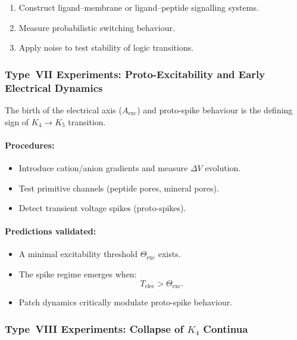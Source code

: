 \begin{enumerate}
    \item Construct ligand–membrane or ligand–peptide signalling systems.
    \item Measure probabilistic switching behaviour.
    \item Apply noise to test stability of logic transitions.
\end{enumerate}



\subsubsection{Type~VII Experiments: Proto-Excitability and Early Electrical Dynamics}

The birth of the electrical axis ($A_{\mathrm{exc}}$) and proto-spike 
behaviour is the defining sign of $K_4 \rightarrow K_5$ transition.

\paragraph{Procedures:}

\begin{itemize}
    \item Introduce cation/anion gradients and measure $\Delta V$ evolution.
    \item Test primitive channels (peptide pores, mineral pores).
    \item Detect transient voltage spikes (proto-spikes).
\end{itemize}

\paragraph{Predictions validated:}

\begin{itemize}
    \item A minimal excitability threshold $\Theta_{\mathrm{exc}}$ exists.
    \item The spike regime emerges when:
          \[
              T_{\mathrm{elec}} > \Theta_{\mathrm{exc}}.
          \]
    \item Patch dynamics critically modulate proto-spike behaviour.
\end{itemize}



\subsubsection{Type~VIII Experiments: Collapse of \texorpdfstring{$K_4$}{K_4} Continua}

